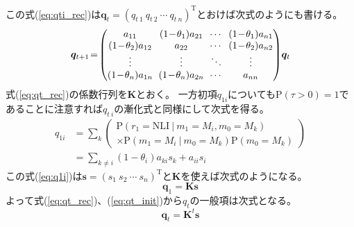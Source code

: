 \documentclass{jarticle}
\numberwithin{equation}{section}
\numberwithin{table}{section}
\theoremstyle{plain}
\begin{document}
この式(\ref{eq:qti_rec})は$ \bm{q}_t = (q_{t\ 1}\ q_{t\ 2}\ \cdots\ q_{t\ n})^\mathrm{T} $とおけば次式のようにも書ける。
\begin{equation}
    \arraycolsep3pt
    \bm{q}_{t + 1} \! = \!
    \begin{pmatrix}
        a_{1 1} & (1 \! - \! \theta_1) a_{2 1} & \cdots & (1 \! - \! \theta_1) a_{n 1} \\
        (1 \! - \! \theta_2) a_{1 2} & a_{2 2} & \cdots & (1 \! - \! \theta_2) a_{n 2} \\
        \vdots & \vdots & \ddots & \vdots \\
        (1 \! - \! \theta_n) a_{1 n} & (1 \! - \! \theta_n) a_{2 n} & \cdots & a_{n n} \\
    \end{pmatrix}
    \! \bm{q}_t
    \label{eq:qt_rec}
\end{equation}
式(\ref{eq:qt_rec})の係数行列を$ \bm{K} $とおく。
一方初項$ q_{1 i} $についても$ \mathrm{P}(\tau > 0) = 1 $であることに注意すれば$q_{t\ i}$の漸化式と同様にして次式を得る。
\begin{align}
    q_{1 i} & = \! \sum_{k} \left(
        \begin{array}{l}
            \mathrm{P}(r_1 = \mathrm{NLI}\ |\ m_1 = M_i , m_0 = M_k) \\
            \times \mathrm{P}(m_1 = M_i\ |\ m_0 = M_k) \mathrm{P}(m_0 = M_k)
        \end{array}
    \right) \\
    & = \! \sum_{k \ne i} (1 - \theta_i) a_{k i} s_k + a_{i i} s_i
    \label{eq:q1i}
\end{align}
この式(\ref{eq:q1i})は$ \bm{s} = (s_1\ s_2\ \cdots\ s_n)^\mathrm{T} $と$ \bm{K} $を使えば次式のようになる。
\begin{equation} \label{eq:qt_init}
    \bm{q}_1 = \bm{K} \bm{s}
\end{equation}
よって式(\ref{eq:qt_rec})、(\ref{eq:qt_init})から$ q_t $の一般項は次式となる。
\begin{equation} \label{eq:qt}
    \bm{q}_t = \bm{K}^t \bm{s}
\end{equation}
\end{document}
